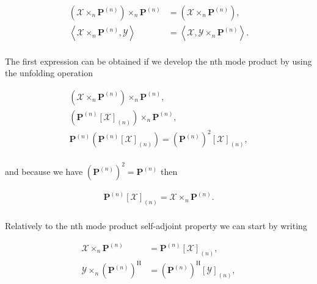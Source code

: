 \documentclass[a4paper,10pt]{article}
\begin{document}
\begin{enumerate}
\begin{enumerate}
            \begin{align}
                \left( \mathcal{X} \times_{n} \boldsymbol{P}^{(n)} \right) \times_{n} \boldsymbol{P}^{(n)} &= \left( \mathcal{X} \times_{n} \boldsymbol{P}^{(n)} \right), \\
                \left< \mathcal{X} \times_{n} \boldsymbol{P}^{(n)}, \mathcal{Y} \right> &= \left< \mathcal{X},  \mathcal{Y} \times_{n} \boldsymbol{P}^{(n)}\right>.  
            \end{align}
            
            \paragraph{}The first expression can be obtained if we develop the nth mode product by using the unfolding operation
            
            \begin{align}
                \left( \mathcal{X} \times_{n} \boldsymbol{P}^{(n)} \right) \times_{n} \boldsymbol{P}^{(n)}, \\
                \left( \boldsymbol{P}^{(n)} \left[\mathcal{X}\right]_{(n)} \right) \times_{n} \boldsymbol{P}^{(n)}, \\
                \boldsymbol{P}^{(n)} \left( \boldsymbol{P}^{(n)} \left[\mathcal{X}\right]_{(n)} \right) = \left(\boldsymbol{P}^{(n)}\right)^2 \left[\mathcal{X}\right]_{(n)}, \\
            \end{align}
            
            and because we have $\left(\boldsymbol{P}^{(n)}\right)^2 = \boldsymbol{P}^{(n)}$ then 
            
            \begin{align}
                \boldsymbol{P}^{(n)} \left[\mathcal{X}\right]_{(n)} = \mathcal{X} \times_{n} \boldsymbol{P}^{(n)}.
            \end{align}
            
            \paragraph{}Relatively to the nth mode product self-adjoint property we can start by writing 
            
            \begin{align}
                \mathcal{X} \times_{n} \boldsymbol{P}^{(n)} &= \boldsymbol{P}^{(n)} \left[\mathcal{X}\right]_{(n)}, \\
                \mathcal{Y} \times_{n} \left(\boldsymbol{P}^{(n)}\right)^{\text{H}} &= \left(\boldsymbol{P}^{(n)}\right)^{\text{H}} \left[\mathcal{Y}\right]_{(n)}, \\
            \end{align}
            

\end{enumerate}
\end{enumerate}
\end{document}

